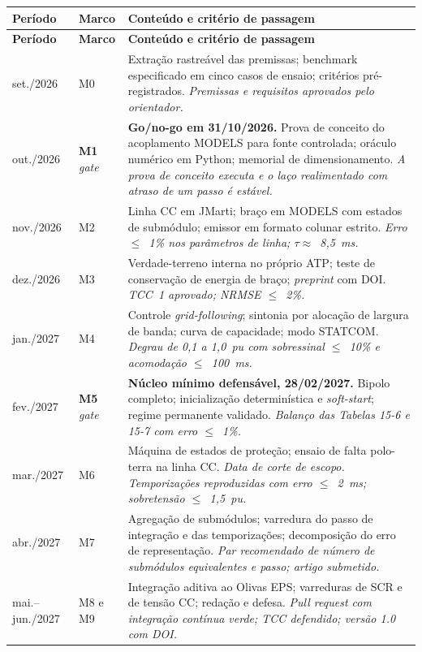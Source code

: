 \documentclass[12pt,a4paper]{article}
\begin{document}
{\small
\begin{xltabular}{\textwidth}{@{}p{2.1cm}p{1.6cm}X@{}}
\toprule
\textbf{Período} & \textbf{Marco} & \textbf{Conteúdo e critério de passagem} \\
\midrule
\endfirsthead
\toprule
\textbf{Período} & \textbf{Marco} & \textbf{Conteúdo e critério de passagem} \\
\midrule
\endhead
\bottomrule
\endfoot
set./2026 & M0 &
Extração rastreável das premissas; benchmark especificado em cinco casos de ensaio; critérios
pré-registrados. \emph{Premissas e requisitos aprovados pelo orientador.} \\
out./2026 & \textbf{M1} \newline \emph{gate} &
\textbf{Go/no-go em 31/10/2026.} Prova de conceito do acoplamento MODELS para fonte controlada;
oráculo numérico em Python; memorial de dimensionamento. \emph{A prova de conceito executa e o laço
realimentado com atraso de um passo é estável.} \\
nov./2026 & M2 &
Linha CC em JMarti; braço em MODELS com estados de submódulo; emissor em formato colunar estrito.
\emph{Erro $\leq$~1\% nos parâmetros de linha; $\tau \approx$~8,5~ms.} \\
dez./2026 & M3 &
Verdade-terreno interna no próprio ATP; teste de conservação de energia de braço; \emph{preprint}
com DOI. \emph{TCC~1 aprovado; NRMSE $\leq$~2\%.} \\
jan./2027 & M4 &
Controle \emph{grid-following}; sintonia por alocação de largura de banda; curva de capacidade;
modo STATCOM. \emph{Degrau de 0,1 a 1,0~pu com sobressinal $\leq$~10\% e acomodação $\leq$~100~ms.} \\
fev./2027 & \textbf{M5} \newline \emph{gate} &
\textbf{Núcleo mínimo defensável, 28/02/2027.} Bipolo completo; inicialização determinística e
\emph{soft-start}; regime permanente validado. \emph{Balanço das Tabelas 15-6 e 15-7 com erro
$\leq$~1\%.} \\
mar./2027 & M6 &
Máquina de estados de proteção; ensaio de falta polo-terra na linha CC. \emph{Data de corte de
escopo. Temporizações reproduzidas com erro $\leq$~2~ms; sobretensão $\leq$~1,5~pu.} \\
abr./2027 & M7 &
Agregação de submódulos; varredura do passo de integração e das temporizações; decomposição do erro
de representação. \emph{Par recomendado de número de submódulos equivalentes e passo; artigo
submetido.} \\
mai.--jun./2027 & M8 e M9 &
Integração aditiva ao Olivas EPS; varreduras de SCR e de tensão CC; redação e defesa.
\emph{Pull request com integração contínua verde; TCC defendido; versão 1.0 com DOI.} \\
\end{xltabular}}
\end{document}
